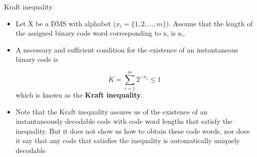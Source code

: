 
{ Kraft inequality}
\begin{itemize}
\item Let X be a DMS with alphabet ($x _i = \{1, 2, . . . ,m\}$). Assume that the length of the assigned binary
code word corresponding to x, is n,.
\item A necessary and sufficient condition for the existence of an instantaneous binary code is
 
 \[ K = \sum^{m}_{i=1}2^{-n_i} \leq 1 \]
which is known as the \textbf{Kraft inequality}.
\item Note that the Kraft inequality assures us of the existence of an instantaneously decodable code
with code word lengths that satisfy the inequality. But it does not show us how to obtain these code
words, nor does it say that any code that satisfies the inequality is automatically uniquely decodable
\end{itemize}


